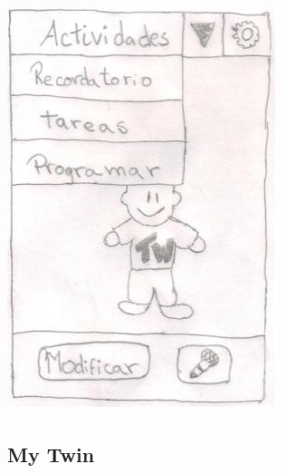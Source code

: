 \documentclass[10pt]{article}
\begin{document}
{\begin{flushleft}
\begin{center}
\includegraphics[scale=0.6]{Twin3}
\end{center}


\end{flushleft}


\newpage
\begin{flushleft}
\subsection{My Twin}

\end{flushleft}}
\end{document}
